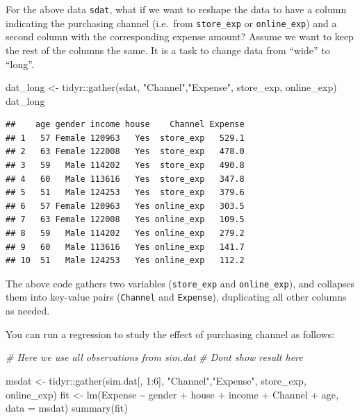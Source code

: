 \documentclass[
  12pt,
]{krantz}
\makeatletter
\newenvironment{Shaded}{\begin{snugshade}}{\end{snugshade}}
\newcommand{\AttributeTok}[1]{\textcolor[rgb]{0.61,0.61,0.61}{#1}}
\newcommand{\CommentTok}[1]{\textcolor[rgb]{0.37,0.37,0.37}{\textit{#1}}}
\newcommand{\DecValTok}[1]{\textcolor[rgb]{0.06,0.06,0.06}{#1}}
\newcommand{\FunctionTok}[1]{\textcolor[rgb]{0,0,0}{#1}}
\newcommand{\NormalTok}[1]{#1}
\newcommand{\OtherTok}[1]{\textcolor[rgb]{0.37,0.37,0.37}{#1}}
\newcommand{\SpecialCharTok}[1]{\textcolor[rgb]{0,0,0}{#1}}
\newcommand{\StringTok}[1]{\textcolor[rgb]{0.5,0.5,0.5}{#1}}
\newenvironment{kframe}{%
\medskip{}
\setlength{\fboxsep}{.8em}
 \def\at@end@of@kframe{}%
 \ifinner\ifhmode%
  \def\at@end@of@kframe{\end{minipage}}%
  \begin{minipage}{\columnwidth}%
 \fi\fi%
 \def\FrameCommand##1{\hskip\@totalleftmargin \hskip-\fboxsep
 \colorbox{shadecolor}{##1}\hskip-\fboxsep
     \hskip-\linewidth \hskip-\@totalleftmargin \hskip\columnwidth}%
 \MakeFramed {\advance\hsize-\width
   \@totalleftmargin\z@ \linewidth\hsize
   \@setminipage}}%
 {\par\unskip\endMakeFramed%
 \at@end@of@kframe}
\renewenvironment{Shaded}{\begin{kframe}}{\end{kframe}}
\makeatother
\begin{document}
For the above data \texttt{sdat}, what if we want to reshape the data to have a column indicating the purchasing channel (i.e.~from \texttt{store\_exp} or \texttt{online\_exp}) and a second column with the corresponding expense amount? Assume we want to keep the rest of the columns the same. It is a task to change data from ``wide'' to ``long''.

\begin{Shaded}
\begin{Highlighting}[]
\NormalTok{dat\_long }\OtherTok{\textless{}{-}}\NormalTok{ tidyr}\SpecialCharTok{::}\FunctionTok{gather}\NormalTok{(sdat, }\StringTok{"Channel"}\NormalTok{,}\StringTok{"Expense"}\NormalTok{, }
\NormalTok{                       store\_exp, online\_exp)}
\NormalTok{dat\_long}
\end{Highlighting}
\end{Shaded}

\begin{verbatim}
##    age gender income house    Channel Expense
## 1   57 Female 120963   Yes  store_exp   529.1
## 2   63 Female 122008   Yes  store_exp   478.0
## 3   59   Male 114202   Yes  store_exp   490.8
## 4   60   Male 113616   Yes  store_exp   347.8
## 5   51   Male 124253   Yes  store_exp   379.6
## 6   57 Female 120963   Yes online_exp   303.5
## 7   63 Female 122008   Yes online_exp   109.5
## 8   59   Male 114202   Yes online_exp   279.2
## 9   60   Male 113616   Yes online_exp   141.7
## 10  51   Male 124253   Yes online_exp   112.2
\end{verbatim}

The above code gathers two variables (\texttt{store\_exp} and \texttt{online\_exp}), and collapses them into key-value pairs (\texttt{Channel} and \texttt{Expense}), duplicating all other columns as needed.

You can run a regression to study the effect of purchasing channel as follows:

\begin{Shaded}
\begin{Highlighting}[]
\CommentTok{\# Here we use all observations from sim.dat}
\CommentTok{\# Don\textquotesingle{}t show result here}

\NormalTok{msdat }\OtherTok{\textless{}{-}}\NormalTok{ tidyr}\SpecialCharTok{::}\FunctionTok{gather}\NormalTok{(sim.dat[, }\DecValTok{1}\SpecialCharTok{:}\DecValTok{6}\NormalTok{], }\StringTok{"Channel"}\NormalTok{,}\StringTok{"Expense"}\NormalTok{, }
\NormalTok{                       store\_exp, online\_exp)}
\NormalTok{fit }\OtherTok{\textless{}{-}} \FunctionTok{lm}\NormalTok{(Expense }\SpecialCharTok{\textasciitilde{}}\NormalTok{ gender }\SpecialCharTok{+}\NormalTok{ house }\SpecialCharTok{+}\NormalTok{ income }\SpecialCharTok{+}\NormalTok{ Channel }\SpecialCharTok{+}\NormalTok{ age, }
          \AttributeTok{data =}\NormalTok{ msdat)}
\FunctionTok{summary}\NormalTok{(fit)}
\end{Highlighting}
\end{Shaded}
\end{document}
